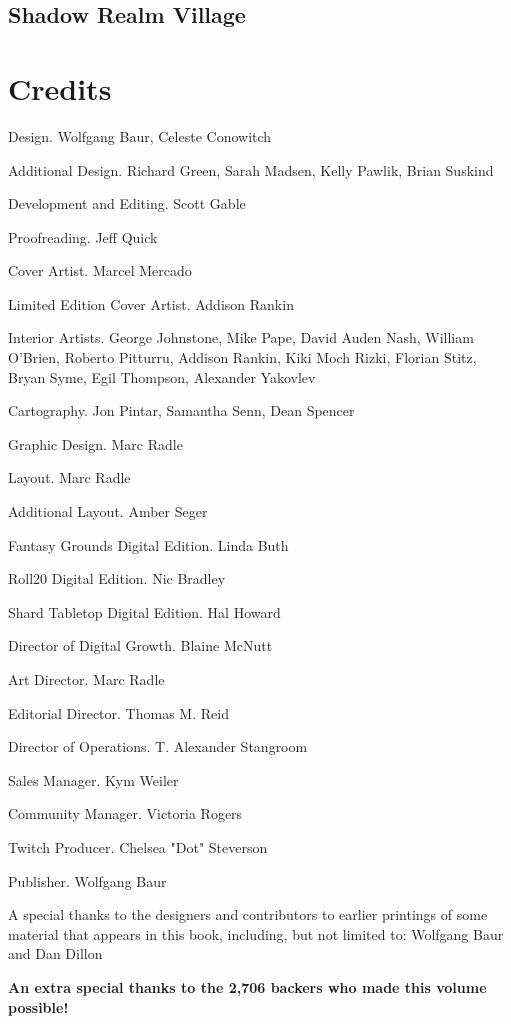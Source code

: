 \documentclass[10pt,a4paper,twoside,bg=print,twocolumn,openany,nodeprecatedcode]{dndbook}
\begin{document}
\section{Shadow Realm Village}
\chapter{Credits}

\begin{description}
\begin{multicols}{2}
\item[Design.]
Wolfgang Baur, Celeste Conowitch
\item[Additional Design.]
Richard Green, Sarah Madsen, Kelly Pawlik, Brian Suskind
\item[Development and Editing.]
Scott Gable
\item[Proofreading.]
Jeff Quick
\item[Cover Artist.]
Marcel Mercado
\item[Limited Edition Cover Artist.]
Addison Rankin
\item[Interior Artists.]
George Johnstone, Mike Pape, David Auden Nash, William O'Brien, Roberto Pitturru, Addison Rankin, Kiki Moch Rizki, Florian Stitz, Bryan Syme, Egil Thompson, Alexander Yakovlev
\item[Cartography.]
Jon Pintar, Samantha Senn, Dean Spencer
\item[Graphic Design.]
Marc Radle
\item[Layout.]
Marc Radle
\item[Additional Layout.]
Amber Seger
\item[Fantasy Grounds Digital Edition.]
Linda Buth
\item[Roll20 Digital Edition.]
Nic Bradley
\item[Shard Tabletop Digital Edition.]
Hal Howard
\item[Director of Digital Growth.]
Blaine McNutt
\item[Art Director.]
Marc Radle
\item[Editorial Director.]
Thomas M. Reid
\item[Director of Operations.]
T. Alexander Stangroom
\item[Sales Manager.]
Kym Weiler
\item[Community Manager.]
Victoria Rogers
\item[Twitch Producer.]
Chelsea "Dot" Steverson
\item[Publisher.]
Wolfgang Baur
\item A special thanks to the designers and contributors to earlier printings of some material that appears in this book, including, but not limited to: Wolfgang Baur and Dan Dillon
\item \textbf{An extra special thanks to the 2,706 backers who made this volume possible!}
\end{multicols}

\end{description}
\end{document}
